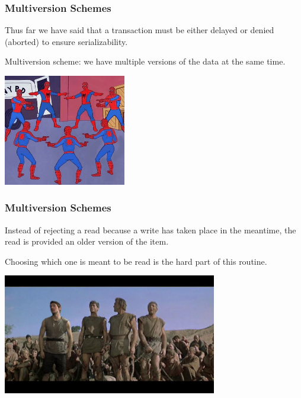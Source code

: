 \begin{frame}
\frametitle{Multiversion Schemes}

Thus far we have said that a transaction must be either delayed or denied (aborted) to ensure serializability. 

Multiversion scheme: we have multiple versions of the data at the same time.

\begin{center}
	\includegraphics[width=0.4\textwidth]{images/spidermen.jpg}
\end{center}

\end{frame}

\begin{frame}
\frametitle{Multiversion Schemes}

Instead of rejecting a read because a write has taken place in the meantime, the read is provided an older version of the item. 

Choosing which one is meant to be read is the hard part of this routine.

\begin{center}
	\includegraphics[width=0.7\textwidth]{images/spartacus.jpg}
\end{center}

\end{frame}

